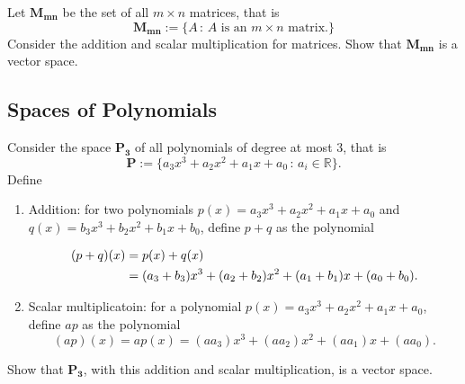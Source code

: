 \documentclass[20pt,a4paper]{extarticle}
\newcounter{example}
\begin{document}
\begin{example}
Let $\mathbf{M_{mn}}$ be the set of all $m \times n$ matrices, that is
	\[
		\mathbf{M_{mn}} := \{ A \, : \, A \text{ is an } m \times n \text{ matrix.} \}
	\]
Consider the addition and scalar multiplication for matrices. Show that $\mathbf{M_{mn}}$ is a vector space.
\end{example}

\begin{solution}

\end{solution}

\newpage

\subsection{Spaces of Polynomials}

\begin{example}
Consider the space $\mathbf{P_3}$ of all polynomials of degree at most $3$, that is
	\[
		\mathbf{P} := \{ a_3 x^3 + a_2 x^2 + a_1 x + a_0 \, : \, a_i \in \mathbb{R} \} .
	\]
Define
	\begin{enumerate}
		\item Addition: for two polynomials $p(x) = a_3 x^3 + a_2 x^2 + a_1 x + a_0$ and $q(x) = b_3 x^3 + b_2 x^2 + b_1 x + b_0$, define $p + q$ as the polynomial
		\begin{small}
			\begin{align*}
				(p + q) (x) &= p (x) + q(x) \\ 
				&= { \small (a_3 + b_3) x^3 + (a_2 + b_2) x^2 + (a_1 + b_1) x + (a_0 + b_0) } .
			\end{align*}
		\end{small}
		\item Scalar multiplicatoin: for a polynomial $p (x) = a_3 x^3 + a_2 x^2 + a_1 x + a_0$, define $ap$ as the polynomial
			\[
				(a p) (x) = a p (x) = (a a_3) x^3 + (a a_2) x^2 + (a a_1)x + (a a_0) .
			\]
	\end{enumerate}
Show that $\mathbf{P_3}$, with this addition and scalar multiplication, is a vector space.
\end{example}

\begin{solution}

\end{solution}

\newpage 

\phantom{2} 

\newpage 
\end{document}
